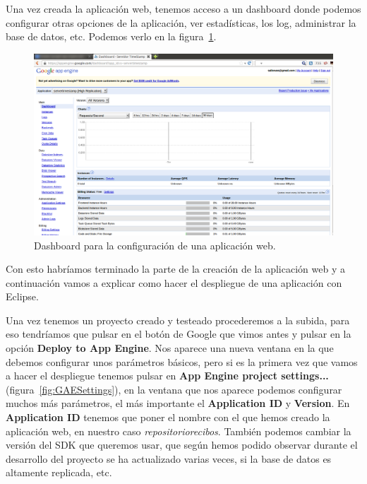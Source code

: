 Una vez creada la aplicación web, tenemos acceso a un dashboard donde podemos configurar otras opciones de la aplicación, ver estadísticas, los log, administrar la base de datos, etc. Podemos verlo en la figura~\ref{fig:dashboardGAE}.

\begin{figure}[hbt]
  \centering
    \includegraphics[scale=0.4]{./ConfiguracionEclipse/imagenes/dashboardGAE.png}
  \caption{Dashboard para la configuración de una aplicación web.}
  \label{fig:dashboardGAE}
\end{figure}

Con esto habríamos terminado la parte de la creación de la aplicación web y a continuación vamos a explicar como hacer el despliegue de una aplicación con Eclipse.

Una vez tenemos un proyecto creado y testeado procederemos a la subida, para eso tendríamos que pulsar en el botón de Google que vimos antes y pulsar en la opción \textbf{Deploy to App Engine}. Nos aparece una nueva ventana en la que debemos configurar unos parámetros básicos, pero si es la primera vez que vamos a hacer el despliegue tenemos pulsar en \textbf{App Engine project settings...} (figura~\ref{fig:GAESettings}), en la ventana que nos aparece podemos configurar muchos más parámetros, el más importante el \textbf{Application ID} y \textbf{Version}. En \textbf{Application ID} tenemos que poner el nombre con el que hemos creado la aplicación web, en nuestro caso \textit{repositoriorecibos}. También podemos cambiar la versión del SDK que queremos usar, que según hemos podido observar durante el desarrollo del proyecto se ha actualizado varias veces, si la base de datos es altamente replicada, etc.

